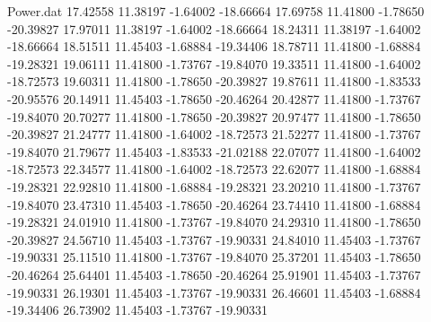 \begin{filecontents}{Power.dat}
  17.42558   11.38197   -1.64002  -18.66664
  17.69758   11.41800   -1.78650  -20.39827
  17.97011   11.38197   -1.64002  -18.66664
  18.24311   11.38197   -1.64002  -18.66664
  18.51511   11.45403   -1.68884  -19.34406
  18.78711   11.41800   -1.68884  -19.28321
  19.06111   11.41800   -1.73767  -19.84070
  19.33511   11.41800   -1.64002  -18.72573
  19.60311   11.41800   -1.78650  -20.39827
  19.87611   11.41800   -1.83533  -20.95576
  20.14911   11.45403   -1.78650  -20.46264
  20.42877   11.41800   -1.73767  -19.84070
  20.70277   11.41800   -1.78650  -20.39827
  20.97477   11.41800   -1.78650  -20.39827
  21.24777   11.41800   -1.64002  -18.72573
  21.52277   11.41800   -1.73767  -19.84070
  21.79677   11.45403   -1.83533  -21.02188
  22.07077   11.41800   -1.64002  -18.72573
  22.34577   11.41800   -1.64002  -18.72573
  22.62077   11.41800   -1.68884  -19.28321
  22.92810   11.41800   -1.68884  -19.28321
  23.20210   11.41800   -1.73767  -19.84070
  23.47310   11.45403   -1.78650  -20.46264
  23.74410   11.41800   -1.68884  -19.28321
  24.01910   11.41800   -1.73767  -19.84070
  24.29310   11.41800   -1.78650  -20.39827
  24.56710   11.45403   -1.73767  -19.90331
  24.84010   11.45403   -1.73767  -19.90331
  25.11510   11.41800   -1.73767  -19.84070
  25.37201   11.45403   -1.78650  -20.46264
  25.64401   11.45403   -1.78650  -20.46264
  25.91901   11.45403   -1.73767  -19.90331
  26.19301   11.45403   -1.73767  -19.90331
  26.46601   11.45403   -1.68884  -19.34406
  26.73902   11.45403   -1.73767  -19.90331
\end{filecontents}
